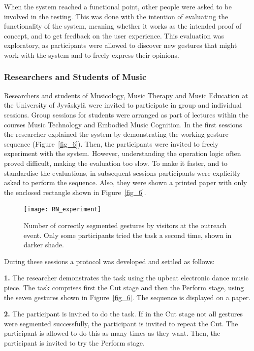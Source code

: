 \documentclass{nime-alternate_MANUSCRIPT} %
\begin{document}
When the system reached a functional point, other people were asked to be involved in the testing. This was done with the intention of evaluating the functionality of the system, meaning whether it works as the intended proof of concept, and to get feedback on the user experience. This evaluation was exploratory, as participants were allowed to discover new gestures that might work with the system and to freely express their opinions.

\subsubsection{Researchers and Students of Music}

Researchers and students of Musicology, Music Therapy and Music Education at the 
University of Jyväskylä
were invited to participate in group and individual sessions. Group sessions for students were arranged as part of lectures within the courses Music Technology and Embodied Music Cognition. In the first sessions the researcher explained the system by demonstrating the working gesture sequence (Figure~\ref{fig_6}). Then, the participants were invited to freely experiment with the system. However, understanding the operation logic often proved difficult, making the evaluation too slow. To make it faster, and to standardise the evaluations, in subsequent sessions participants were explicitly asked to perform the sequence. Also, they were shown a printed paper with only the enclosed rectangle shown in Figure~\ref{fig_6}. 

\begin{figure}[t!]
	\centering
		\texttt{[image: RN\_experiment]}
	\caption{Number of correctly segmented gestures by visitors at the outreach event. Only some participants tried the task a second time, shown in darker shade.}
	\label{fig_7}
\end{figure}

During these sessions a protocol was developed and settled as follows:

\textbf{1.}	The researcher demonstrates the task using the upbeat electronic dance music piece. The task comprises first the Cut stage and then the Perform stage, using the seven gestures shown in Figure~\ref{fig_6}. The sequence is displayed on a paper.

\textbf{2.}	The participant is invited to do the task. If in the Cut stage not all gestures were segmented successfully, the participant is invited to repeat the Cut. The participant is allowed to do this as many times as they want. Then, the participant is invited to try the Perform stage.
\end{document}
